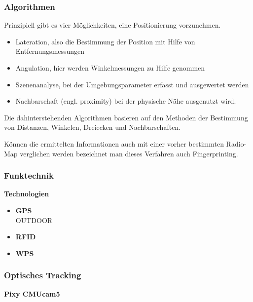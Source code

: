\begin{itemize}
    \subsubsection{Algorithmen}

    Prinzipiell gibt es vier Möglichkeiten, eine Positionierung vorzunehmen.
    \begin{itemize}
      \item Lateration, also die Bestimmung der Position mit Hilfe von Entfernungsmessungen
      \item Angulation, hier werden Winkelmessungen zu Hilfe genommen
      \item Szenenanalyse, bei der Umgebungsparameter erfasst und ausgewertet werden
      \item Nachbarschaft (engl. proximity) bei der physische Nähe ausgenutzt wird.
    \end{itemize}

    Die dahinterstehenden Algorithmen basieren auf den Methoden der Bestimmung von Distanzen, Winkelen, Dreiecken und Nachbarschaften.

    Können die ermittelten Informationen auch mit einer vorher bestimmten Radio-Map verglichen werden bezeichnet man dieses Verfahren auch Fingerprinting.



    \subsubsection{Funktechnik}


    \textbf{Technologien}\\
    \begin{itemize}
        \item \textbf{GPS}\\
        OUTDOOR
        \item \textbf{RFID}\\
        \item \textbf{WPS}\\
      \end{itemize}

    \subsubsection{Optisches Tracking}

    \textbf{Pixy CMUcam5}\\





\end{itemize}
